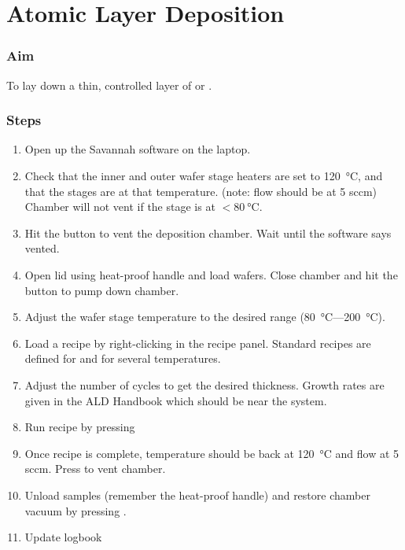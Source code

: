 \section{Atomic Layer Deposition}
\subsubsection{Aim}
To lay down a thin, controlled layer of  or .

\subsubsection{Steps}
\begin{enumerate}
\item Open up the Savannah software on the laptop.
\item Check that the inner and outer wafer stage heaters are set to \SI{120}{\degreeCelsius}, and that the stages
are at that temperature. (note:  flow should be at 5 sccm) Chamber will not vent if the stage is at $<\SI{80}{\degreeCelsius}$.
\item Hit the  button to vent the deposition chamber. Wait until the software says vented.
\item Open lid using heat-proof handle and load wafers. Close chamber and hit the  button to pump down chamber.
\item Adjust the wafer stage temperature to the desired range (\SI{80}{\degreeCelsius}---\SI{200}{\degreeCelsius}).
\item Load a recipe by right-clicking in the recipe panel. Standard recipes are defined for  and  for several temperatures.
\item Adjust the number of cycles to get the desired thickness. Growth rates are given in the ALD Handbook which should be near the system.
\item Run recipe by pressing 
\item Once recipe is complete, temperature should be back at \SI{120}{\degreeCelsius} and  flow at 5 sccm. Press  to vent chamber.
\item Unload samples (remember the heat-proof handle) and restore chamber vacuum by pressing .
\item Update logbook
\end{enumerate}

